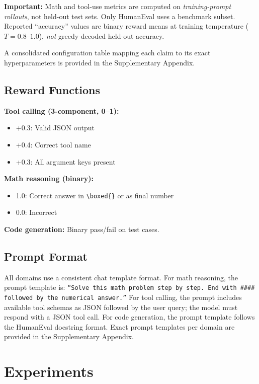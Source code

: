 \documentclass{article}
\begin{document}
\textbf{Important:} Math and tool-use metrics are computed on \emph{training-prompt rollouts}, not held-out test sets. Only HumanEval uses a benchmark subset. Reported ``accuracy'' values are binary reward means at training temperature ($T{=}0.8$--$1.0$), \emph{not} greedy-decoded held-out accuracy.

A consolidated configuration table mapping each claim to its exact hyperparameters is provided in the Supplementary Appendix.

\subsection{Reward Functions}

\textbf{Tool calling (3-component, 0--1):}
\begin{itemize}
    \item +0.3: Valid JSON output
    \item +0.4: Correct tool name
    \item +0.3: All argument keys present
\end{itemize}

\textbf{Math reasoning (binary):}
\begin{itemize}
    \item 1.0: Correct answer in \texttt{\textbackslash boxed\{\}} or as final number
    \item 0.0: Incorrect
\end{itemize}

\textbf{Code generation:} Binary pass/fail on test cases.

\subsection{Prompt Format}

All domains use a consistent chat template format. For math reasoning, the prompt template is: \texttt{``Solve this math problem step by step. End with \#\#\#\# followed by the numerical answer.''} For tool calling, the prompt includes available tool schemas as JSON followed by the user query; the model must respond with a JSON tool call. For code generation, the prompt template follows the HumanEval docstring format. Exact prompt templates per domain are provided in the Supplementary Appendix.

\section{Experiments}
\end{document}
